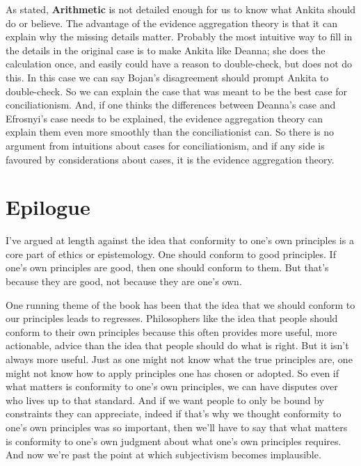 As stated, \textbf{Arithmetic} is not detailed enough for us to know what \gls{Ankita} should do or believe. The advantage of the evidence aggregation theory is that it can explain why the missing details matter. Probably the most intuitive way to fill in the details in the original case is to make \gls{Ankita} like \gls{Deanna}; she does the calculation once, and easily could have a reason to double-check, but does not do this. In this case we can say \gls{Bojan}'s disagreement should prompt \gls{Ankita} to double-check. So we can explain the case that was meant to be the best case for conciliationism. And, if one thinks the differences between \gls{Deanna}'s case and Efrosnyi's case needs to be explained, the evidence aggregation theory can explain them even more smoothly than the conciliationist can. So there is no argument from intuitions about cases for conciliationism, and if any side is favoured by considerations about cases, it is the evidence aggregation theory.

\chapter{Epilogue}
\label{epilogue}

I've argued at length against the idea that conformity to one's own principles is a core part of ethics or epistemology. One should conform to good principles. If one's own principles are good, then one should conform to them. But that's because they are good, not because they are one's own.

One running theme of the book has been that the idea that we should conform to our principles leads to regresses. Philosophers like the idea that people should conform to their own principles because this often provides more useful, more actionable, advice than the idea that people should do what is right. But it isn't always more useful. Just as one might not know what the true principles are, one might not know how to apply principles one has chosen or adopted. So even if what matters is conformity to one's own principles, we can have disputes over who lives up to that standard. And if we want people to only be bound by constraints they can appreciate, indeed if that's why we thought conformity to one's own principles was so important, then we'll have to say that what matters is conformity to one's own judgment about what one's own principles requires. And now we're past the point at which subjectivism becomes implausible.

